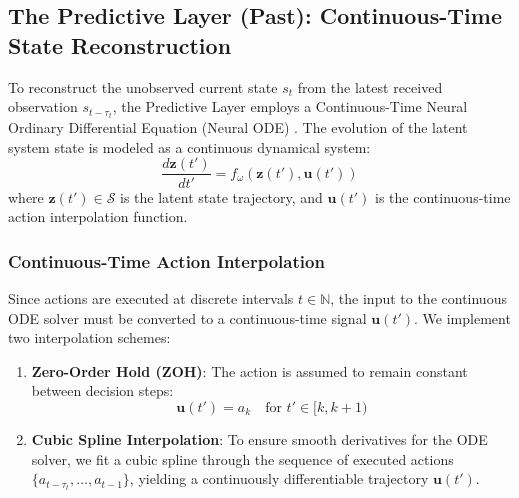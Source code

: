 \documentclass[manuscript, screen, review]{jair}
\begin{document}
\subsection{The Predictive Layer (Past): Continuous-Time State Reconstruction}
To reconstruct the unobserved current state $s_t$ from the latest received observation $s_{t-\tau_t}$, the Predictive Layer employs a Continuous-Time Neural Ordinary Differential Equation (Neural ODE) \citep{chen2018neuralode}. The evolution of the latent system state is modeled as a continuous dynamical system:
\begin{equation}
    \frac{d\mathbf{z}(t')}{dt'} = f_\omega(\mathbf{z}(t'), \mathbf{u}(t'))
\end{equation}
where $\mathbf{z}(t') \in \mathcal{S}$ is the latent state trajectory, and $\mathbf{u}(t')$ is the continuous-time action interpolation function.

\subsubsection{Continuous-Time Action Interpolation}
Since actions are executed at discrete intervals $t \in \mathbb{N}$, the input to the continuous ODE solver must be converted to a continuous-time signal $\mathbf{u}(t')$. We implement two interpolation schemes:
\begin{enumerate}
    \item \textbf{Zero-Order Hold (ZOH)}: The action is assumed to remain constant between decision steps:
    \begin{equation}
        \mathbf{u}(t') = a_k \quad \text{for } t' \in [k, k+1)
    \end{equation}
    \item \textbf{Cubic Spline Interpolation}: To ensure smooth derivatives for the ODE solver, we fit a cubic spline through the sequence of executed actions $\{a_{t-\tau_t}, \dots, a_{t-1}\}$, yielding a continuously differentiable trajectory $\mathbf{u}(t')$.
\end{enumerate}
\end{document}
